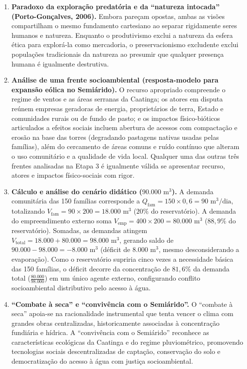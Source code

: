 \begin{boxGabarito}
\begin{enumerate}[leftmargin=1.8em, itemsep=4pt, start=6]
  \item \textbf{Paradoxo da exploração predatória e da ``natureza intocada'' (Porto-Gonçalves, 2006).} Embora pareçam opostas, ambas as visões compartilham o mesmo fundamento cartesiano ao separar rigidamente seres humanos e natureza. Enquanto o produtivismo exclui a natureza da esfera ética para explorá-la como mercadoria, o preservacionismo excludente exclui populações tradicionais da natureza ao presumir que qualquer presença humana é igualmente destrutiva.

  \item \textbf{Análise de uma frente socioambiental (resposta-modelo para expansão eólica no Semiárido).} O recurso apropriado compreende o regime de ventos e as áreas serranas da Caatinga; os atores em disputa reúnem empresas geradoras de energia, proprietários de terra, Estado e comunidades rurais ou de fundo de pasto; e os impactos físico-bióticos articulados a efeitos sociais incluem abertura de acessos com compactação e erosão na base das torres (degradando pastagens nativas usadas pelas famílias), além do cercamento de áreas comuns e ruído contínuo que alteram o uso comunitário e a qualidade de vida local. Qualquer uma das outras três frentes analisadas na Etapa 3 é igualmente válida se apresentar recurso, atores e impactos físico-sociais com rigor.

  \item \textbf{Cálculo e análise do cenário didático ($90.000\text{ m}^3$).}
  A demanda comunitária das 150 famílias corresponde a $Q_{\text{fam}} = 150 \times 0{,}6 = 90\text{ m}^3/\text{dia}$, totalizando $V_{\text{fam}} = 90 \times 200 = 18.000\text{ m}^3$ ($20\%$ do reservatório). A demanda do empreendimento externo soma $V_{\text{emp}} = 400 \times 200 = 80.000\text{ m}^3$ ($88{,}9\%$ do reservatório). Somadas, as demandas atingem $V_{\text{total}} = 18.000 + 80.000 = 98.000\text{ m}^3$, gerando saldo de $90.000 - 98.000 = -8.000\text{ m}^3$ (déficit de $8.000\text{ m}^3$, mesmo desconsiderando a evaporação). Como o reservatório supriria cinco vezes a necessidade básica das 150 famílias, o déficit decorre da concentração de $81{,}6\%$ da demanda total ($\frac{80.000}{98.000}$) em um único agente externo, configurando conflito socioambiental distributivo pelo acesso à água.

  \item \textbf{``Combate à seca'' e ``convivência com o Semiárido''.} O ``combate à seca'' apoia-se na racionalidade instrumental que tenta vencer o clima com grandes obras centralizadas, historicamente associadas à concentração fundiária e hídrica. A ``convivência com o Semiárido'' reconhece as características ecológicas da Caatinga e do regime pluviométrico, promovendo tecnologias sociais descentralizadas de captação, conservação do solo e democratização do acesso à água com justiça socioambiental.


\end{enumerate}
\end{boxGabarito}
